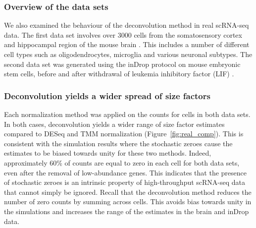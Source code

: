 \documentclass{bmcart}
\def\texttt{[image: ]}
\begin{document}
\subsubsection*{Overview of the data sets}
We also examined the behaviour of the deconvolution method in real scRNA-seq data.
The first data set involves over 3000 cells from the somatosensory cortex and hippocampal region of the mouse brain \cite{zeisel2015brain}.
This includes a number of different cell types such as oligodendrocytes, microglia and various neuronal subtypes.
The second data set was generated using the inDrop protocol on mouse embryonic stem cells, before and after withdrawal of leukemia inhibitory factor (LIF) \cite{klein2015droplet}.

\subsubsection*{Deconvolution yields a wider spread of size factors}
Each normalization method was applied on the counts for cells in both data sets.
In both cases, deconvolution yields a wider range of size factor estimates compared to DESeq and TMM normalization (Figure~\ref{fig:real_comp}).
This is consistent with the simulation results where the stochastic zeroes cause the estimates to be biased towards unity for these two methods.
Indeed, approximately 60\% of counts are equal to zero in each cell for both data sets, even after the removal of low-abundance genes.
This indicates that the presence of stochastic zeroes is an intrinsic property of high-throughput scRNA-seq data that cannot simply be ignored.
Recall that the deconvolution method reduces the number of zero counts by summing across cells.
This avoids bias towards unity in the simulations and increases the range of the estimates in the brain and inDrop data.

\end{document}

